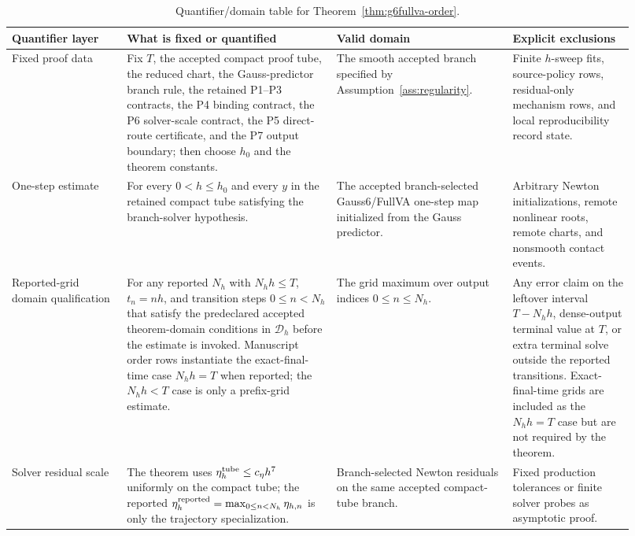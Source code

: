 \documentclass[preprint,12pt]{elsarticle}
\newcommand{\method}{Gauss6\slash FullVA}
\begin{document}
\begin{table}[htbp]
\centering
\caption{Quantifier/domain table for Theorem~\ref{thm:g6fullva-order}.}
\label{tab:quantifier-domain-ledger}
\scriptsize
\setlength{\tabcolsep}{2pt}
\renewcommand{\arraystretch}{0.92}
\begin{tabular}{P{0.17\linewidth}P{0.31\linewidth}P{0.26\linewidth}P{0.18\linewidth}}
\toprule
Quantifier layer & What is fixed or quantified & Valid domain & Explicit exclusions \\
\midrule
Fixed proof data &
Fix \(T\), the accepted compact proof tube, the reduced chart, the
Gauss-predictor branch rule, the retained P1--P3 contracts, the P4 binding
contract, the P6 solver-scale contract, the P5 direct-route certificate, and
the P7 output boundary;
then choose \(h_0\) and the theorem constants. &
The smooth accepted branch specified by Assumption~\ref{ass:regularity}. &
Finite \(h\)-sweep fits, source-policy rows, residual-only mechanism rows,
and local reproducibility record state. \\
One-step estimate &
For every \(0<h\le h_0\) and every \(y\) in the retained compact tube
satisfying the branch-solver hypothesis. &
The accepted branch-selected \method{} one-step map initialized from the
Gauss predictor. &
Arbitrary Newton initializations, remote nonlinear roots, remote charts, and
nonsmooth contact events. \\
Reported-grid domain qualification &
For any reported \(N_h\) with \(N_hh\le T\), \(t_n=n h\), and transition
steps \(0\le n<N_h\) that satisfy the predeclared accepted theorem-domain
conditions in \(\mathcal D_h\) before the estimate is invoked. Manuscript order rows instantiate the exact-final-time case
\(N_hh=T\) when reported; the \(N_hh<T\) case is only a prefix-grid estimate. &
The grid maximum over output indices \(0\le n\le N_h\). &
Any error claim on the leftover interval \(T-N_hh\), dense-output terminal
value at \(T\), or extra terminal solve outside the reported transitions.
Exact-final-time grids are included as the \(N_hh=T\) case but are not
required by the theorem. \\
Solver residual scale &
The theorem uses \(\eta_h^{\rm tube}\le c_\eta h^7\) uniformly on the
compact tube; the reported \(\eta_h^{\rm reported}=\max_{0\le n<N_h}\eta_{h,n}\) is only the
trajectory specialization. &
Branch-selected Newton residuals on the same accepted compact-tube branch. &
Fixed production tolerances or finite solver probes as asymptotic proof. \\
\bottomrule
\end{tabular}
\end{table}
\end{document}
